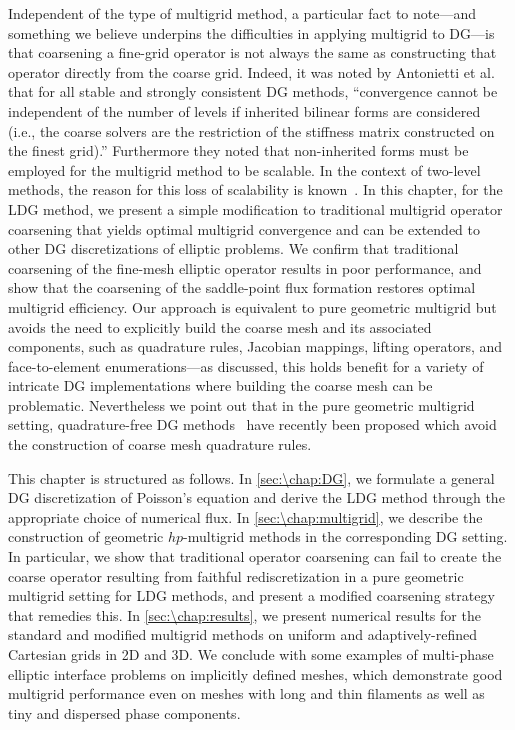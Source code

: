 Independent of the type of multigrid method, a particular fact to note---and something we believe underpins the difficulties in applying multigrid to DG---is that coarsening a fine-grid operator is not always the same as constructing that operator directly from the coarse grid. Indeed, it was noted by Antonietti et al.~\cite{Antonietti_15_01} that for all stable and strongly consistent DG methods, ``convergence cannot be independent of the number of levels if inherited bilinear forms are considered (i.e., the coarse solvers are the restriction of the stiffness matrix constructed on the finest grid).'' Furthermore they noted that non-inherited forms must be employed for the multigrid method to be scalable. In the context of two-level methods, the reason for this loss of scalability is known~\cite{Antonietti_12_01}. In this chapter, for the LDG method, we present a simple modification to traditional multigrid operator coarsening that yields optimal multigrid convergence and can be extended to other DG discretizations of elliptic problems. We confirm that traditional coarsening of the fine-mesh elliptic operator results in poor performance, and show that the coarsening of the saddle-point flux formation restores optimal multigrid efficiency. Our approach is equivalent to pure geometric multigrid but avoids the need to explicitly build the coarse mesh and its associated components, such as quadrature rules, Jacobian mappings, lifting operators, and face-to-element enumerations---as discussed, this holds benefit for a variety of intricate DG implementations where building the coarse mesh can be problematic. Nevertheless we point out that in the pure geometric multigrid setting, quadrature-free DG methods~\cite{Antonietti_18_01} have recently been proposed which avoid the construction of coarse mesh quadrature rules.

This chapter is structured as follows. In \cref{sec:\chap:DG}, we formulate a general DG discretization of Poisson's equation and derive the LDG method through the appropriate choice of numerical flux. In \cref{sec:\chap:multigrid}, we describe the construction of geometric $hp$-multigrid methods in the corresponding DG setting. In particular, we show that traditional operator coarsening can fail to create the coarse operator resulting from faithful rediscretization in a pure geometric multigrid setting for LDG methods, and present a modified coarsening strategy that remedies this. In \cref{sec:\chap:results}, we present numerical results for the standard and modified multigrid methods on uniform and adaptively-refined Cartesian grids in 2D and 3D. We conclude with some examples of multi-phase elliptic interface problems on implicitly defined meshes, which demonstrate good multigrid performance even on meshes with long and thin filaments as well as tiny and dispersed phase components.

